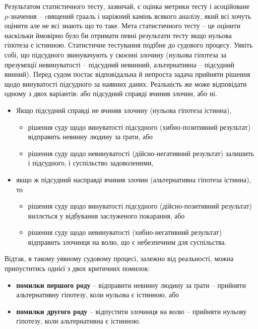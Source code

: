 \documentclass[
  11pt,
]{book}
\begin{document}
Результатом статистичного тесту, зазвичай, є оцінка метрики тесту і асоційоване \(p\)-значення -- cвящений грааль і наріжний камінь всякого аналізу, який всі хочуть оцінити але не всі знають що то таке. Мета статистичного тесту -- це оцінити наскільки ймовірно було би отримати певні результати тесту якщо нульова гіпотеза є істинною. Статистичне тестування подібне до судового процесу. Уявіть собі, що підсудного звинувачують у скоєнні злочину (нульова гіпотеза за презумпції невинуватості -- підсудний невинний, альтернативна -- підсудний винний). Перед судом постає відповідальна й непроста задача прийняти рішення щодо винуватості підсудного за наявних даних. Реальність же може відповідати одному з двох варіантів: або підсудний справді вчинив злочин, або ні.

\begin{itemize}
\item
  Якщо підсудний справді не вчиняв злочину (нульова гіпотеза істинна),

  \begin{itemize}
  \item
    рішення суду щодо винуватості підсудного (хибно-позитивний результат) відправить невинну людину за ґрати, або
  \item
    рішення суду щодо невинуватості (дійсно-негативний результат) залишить і підсудного, і суспільство задоволеними,
  \end{itemize}
\item
  якщо ж підсудний насправді вчинив злочин (альтернативна гіпотеза істинна), то

  \begin{itemize}
  \item
    рішення суду щодо винуватості підсудного (дійсно-позитивний результат) виллється у відбування заслуженого покарання, або
  \item
    рішення суду щодо невинуватості (хибно-негативний результат) відправить злочинця на волю, що є небезпечним для суспільства.
  \end{itemize}
\end{itemize}

Відтак, в такому уявному судовому процесі, залежно від реальності, можна припуститись однієї з двох критичних помилок:

\begin{itemize}
\item
  \textbf{помилки першого роду} -- відправити невинну людину за ґрати -- прийняти альтернативну гіпотезу, коли нульова є істинною, або
\item
  \textbf{помилки другого роду} -- відпустити злочинця на волю -- прийняти нульову гіпотезу, коли альтернативна є істинною.
\end{itemize}
\end{document}
